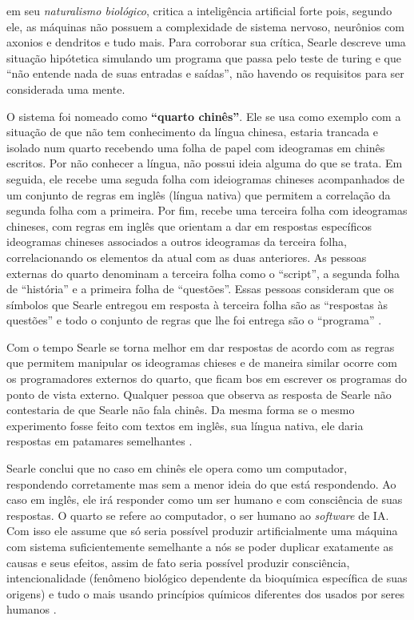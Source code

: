 \documentclass[
  openany]{book}
\begin{document}
\citet{searle1980minds} em seu \emph{naturalismo biológico}, critica a inteligência artificial forte pois, segundo ele, as máquinas não possuem a complexidade de sistema nervoso, neurônios com axonios e dendritos e tudo mais. Para corroborar sua crítica, Searle descreve uma situação hipótetica simulando um programa que passa pelo teste de turing e que ``não entende nada de suas entradas e saídas'', não havendo os requisitos para ser considerada uma mente.

O sistema foi nomeado como \textbf{``quarto chinês''}. Ele se usa como exemplo com a situação de que não tem conhecimento da língua chinesa, estaria trancada e isolado num quarto recebendo uma folha de papel com ideogramas em chinês escritos. Por não conhecer a língua, não possui ideia alguma do que se trata. Em seguida, ele recebe uma seguda folha com ideiogramas chineses acompanhados de um conjunto de regras em inglês (língua nativa) que permitem a correlação da segunda folha com a primeira. Por fim, recebe uma terceira folha com ideogramas chineses, com regras em inglês que orientam a dar em respostas específicos ideogramas chineses associados a outros ideogramas da terceira folha, correlacionando os elementos da atual com as duas anteriores. As pessoas externas do quarto denominam a terceira folha como o ``script'', a segunda folha de ``história'' e a primeira folha de ``questões''. Essas pessoas consideram que os símbolos que Searle entregou em resposta à terceira folha são as ``respostas às questões'' e todo o conjunto de regras que lhe foi entrega são o ``programa'' \citep{guimaraes2019inteligencia}.

Com o tempo Searle se torna melhor em dar respostas de acordo com as regras que permitem manipular os ideogramas chieses e de maneira similar ocorre com os programadores externos do quarto, que ficam bos em escrever os programas do ponto de vista externo. Qualquer pessoa que observa as resposta de Searle não contestaria de que Searle não fala chinês. Da mesma forma se o mesmo experimento fosse feito com textos em inglês, sua língua nativa, ele daria respostas em patamares semelhantes \citep{guimaraes2019inteligencia}.

Searle conclui que no caso em chinês ele opera como um computador, respondendo corretamente mas sem a menor ideia do que está respondendo. Ao caso em inglês, ele irá responder como um ser humano e com consciência de suas respostas. O quarto se refere ao computador, o ser humano ao \emph{software} de IA. Com isso ele assume que só seria possível produzir artificialmente uma máquina com sistema suficientemente semelhante a nós se poder duplicar exatamente as causas e seus efeitos, assim de fato seria possível produzir consciência, intencionalidade (fenômeno biológico dependente da
bioquímica específica de suas origens) e tudo o mais usando princípios químicos diferentes dos usados por seres humanos \citep{searle1980minds} .
\end{document}
